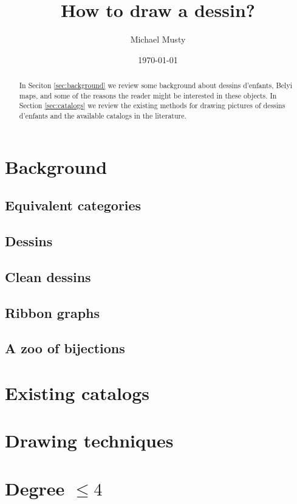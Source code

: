 \documentclass{amsart}
\numberwithin{equation}{section}
\theoremstyle{definition}
\theoremstyle{remark}
\begin{document}
\title{How to draw a dessin?}

\author{Michael Musty}
\address{ICERM Fall 2019}

\date{\today}

\begin{abstract}
  In Seciton \ref{sec:background}
  we review some background about dessins d'enfants,
  Belyi maps, and some of the reasons the reader
  might be interested in these objects.
  In Section \ref{sec:catalogs}
  we review the existing methods for drawing
  pictures of dessins d'enfants and the available
  catalogs in the literature.
\end{abstract}

\maketitle
\tableofcontents

\section{Background}{\label{sec:background}
  \subsection{Equivalent categories}{
    \subsection{Dessins}{
    }
    \subsection{Clean dessins}{
    }
    \subsection{Ribbon graphs}{
    }
    \subsection{A zoo of bijections}{
    }
  }
}
\section{Existing catalogs}{\label{sec:catalogs}
}
\section{Drawing techniques}{
}
\section{Degree $\leq 4$}{
}
\end{document}
